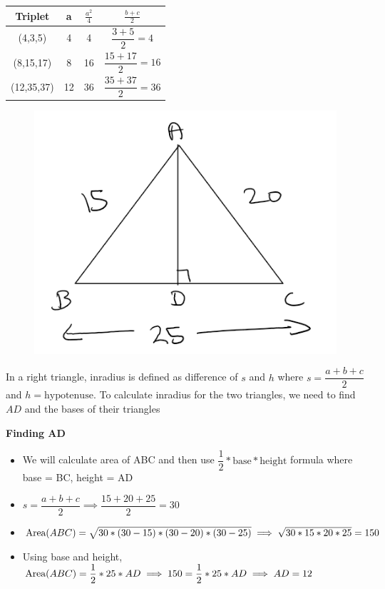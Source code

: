 \begin{table}[h!]
    \centering
    \begin{tabular}{|| c | c | c | c ||}
        \hline
         \textbf{Triplet} & \textbf{a} & $\frac{a^2}{4}$ & $\frac{b + c}{2}$  \\
        \hline
         (4,3,5) & 4 & 4 & $\dfrac{3 + 5}{2} = 4 $ \\
        \hline
         (8,15,17) & 8 & 16 & $\dfrac{15 + 17}{2} = 16 $ \\
        \hline
         (12,35,37) & 12 & 36 & $\dfrac{35 + 37}{2} = 36 $ \\
        \hline
    \end{tabular}
\end{table}


\begin{figure}[h!]
    \centering
    \includegraphics[width=0.4\linewidth]{Quant//Geometry//Images//Triangles/rodha_triangle_5_q1.png}
\end{figure}

In a right triangle, inradius is defined as difference of $s$ and $h$ where $s = \dfrac{a + b + c}{2}$ and $h = \text{hypotenuse}$. To calculate inradius for the two triangles, we need to find $AD$ and the bases of their triangles

\vspace{1cm}

\textbf{Finding AD}
\begin{itemize}
    \item We will calculate area of ABC and then use $\dfrac{1}{2} * \text{base} * \text{height}$ formula where base = BC, height = AD
    
    \item $s = \dfrac{a + b + c}{2} \implies \dfrac{15 + 20 + 25}{2} = 30$

    \item $\text{Area}({ABC}) = \sqrt{30 * (30 - 15) * (30 - 20) * (30 - 25)} \implies \sqrt{30 * 15 * 20 * 25} = 150$

    \item Using base and height, $\text{Area}({ABC}) = \dfrac{1}{2} * 25 * AD \implies 150 = \dfrac{1}{2} * 25 * AD \implies AD = 12$
\end{itemize}


